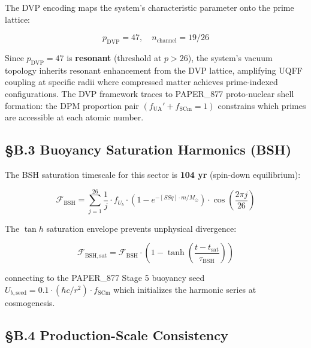 \documentclass[12pt,a4paper]{article}
\begin{document}
The DVP encoding maps the system's characteristic parameter onto the prime lattice:

\begin{equation}
p_{\mathrm{DVP}} = 47, \quad n_{\mathrm{channel}} = 19/26
\end{equation}

Since $p_{\mathrm{DVP}} = 47$ is \textbf{resonant} (threshold at $p > 26$), the system's vacuum topology inherits resonant enhancement from the DVP lattice, amplifying UQFF coupling at specific radii where compressed matter achieves prime-indexed configurations. The DVP framework traces to PAPER\_877 proto-nuclear shell formation: the DPM proportion pair $(f_{\mathrm{UA}}' + f_{\mathrm{SCm}} = 1)$ constrains which primes are accessible at each atomic number.

\subsection{\S{}B.3 Buoyancy Saturation Harmonics (BSH)}

The BSH saturation timescale for this sector is \textbf{104 yr} (spin-down equilibrium):

\begin{equation}
\mathcal{F}_{\mathrm{BSH}} = \sum_{j=1}^{26} \frac{1}{j} \cdot f_U_b \cdot \left(1 - e^{-[SSq] \cdot m/M_\odot}\right) \cdot \cos\!\left(\frac{2\pi j}{26}\right)
\end{equation}

The $\tan h$ saturation envelope prevents unphysical divergence:

\begin{equation}
\mathcal{F}_{\mathrm{BSH,sat}} = \mathcal{F}_{\mathrm{BSH}} \cdot \left(1 - \tanh\!\left(\frac{t - t_{\mathrm{sat}}}{\tau_{\mathrm{BSH}}}\right)\right)
\end{equation}

connecting to the PAPER\_877 Stage 5 buoyancy seed $U_{b,\mathrm{seed}} = 0.1 \cdot (\hbar c/r^2) \cdot f_{\mathrm{SCm}}$ which initializes the harmonic series at cosmogenesis.

\subsection{\S{}B.4 Production-Scale Consistency}
\end{document}

